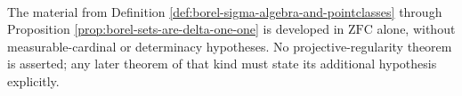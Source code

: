 \begin{remark} \label{rem:descriptive-set-theory-assumption-boundary} \\
The material from Definition \ref{def:borel-sigma-algebra-and-pointclasses} through Proposition \ref{prop:borel-sets-are-delta-one-one} is developed in $\mathrm{ZFC}$ alone, without measurable-cardinal or determinacy hypotheses. No projective-regularity theorem is asserted; any later theorem of that kind must state its additional hypothesis explicitly.
\end{remark}
